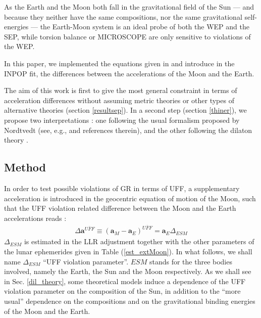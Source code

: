 \documentclass[fleqn,usenatbib,referee]{mnras}
\begin{document}
As the Earth and the Moon both fall in the gravitational field of the Sun --- and because they neither have the same compositions, nor the same gravitational self-energies --- the Earth-Moon system is an ideal probe of both the WEP and the SEP, while torsion balance \cite[]{2003PhRvD..68f2002A} or MICROSCOPE \cite[]{2014AdSpR..54.1119L} are only sensitive to violations of the WEP.

In this paper, we implemented the equations given in \cite{Williams2012} and introduce in the INPOP fit, the differences between the accelerations of the Moon and the Earth.

The aim of this work is first to give the most general constraint in terms of acceleration differences without assuming metric theories or other types of alternative theories (section \ref{resultsep}). In a second step (section \ref{thiner}), we propose two interpretations : one following the usual formalism proposed by Nordtvedt (see, e.g., \cite[]{nordtvedt:2014sc} and references therein), and the other following the dilaton theory \cite[]{damour:1994np,hees:2015ax,minazzoli:2016pr}.


\subsection{Method}

In order to test possible violations of GR in terms of UFF, a supplementary acceleration is introduced in the geocentric equation of motion of the Moon, such that the UFF violation related difference between the Moon and the Earth accelerations reads \cite[]{1968PhRv..170.1186N}:
\begin{eqnarray}
\Delta \bm a^{\overline{UFF}}\equiv (\bm a_M - \bm a_E)^{\overline{UFF}} = \bm a_{E} \Delta_{ESM}
\label{UFF}
\end{eqnarray}
$\Delta_{ESM}$ is estimated in the LLR adjustment together with the other parameters of the lunar ephemerides given in Table (\ref{est_extMoon}). In what follows, we shall name $\Delta_{ESM}$ ``UFF violation parameter''. $ESM$ stands for the three bodies involved, namely the Earth, the Sun and the Moon respectively. As we shall see in Sec. \ref{dil_theory}, some theoretical models induce a dependence of the UFF violation parameter on the composition of the Sun, in addition to the ``more usual'' dependence on the compositions and on the gravitational binding energies of the Moon and the Earth. 
\end{document}
